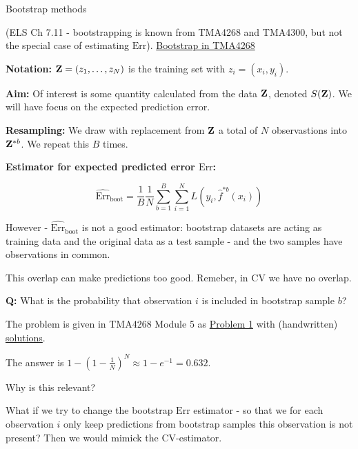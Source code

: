 \documentclass[
  ignorenonframetext,
]{beamer}
\begin{document}
\begin{frame}

\begin{block}{Bootstrap methods}

(ELS Ch 7.11 - bootstrapping is known from TMA4268 and TMA4300, but not
the special case of estimating \(\text{Err}\)).
\href{https://www.math.ntnu.no/emner/TMA4268/2019v/5Resample/5Resample.html\#the_bootstrap}{Bootstrap
in TMA4268}

\textbf{Notation:} \({\bf Z}=(z_1,\ldots,z_N)\) is the training set with
\(z_i=(x_i,y_i)\).

\textbf{Aim:} Of interest is some quantity calculated from the data
\({\bf Z}\), denoted \(S({\bf Z})\). We will have focus on the expected
prediction error.

\textbf{Resampling:} We draw with replacement from \({\bf Z}\) a total
of \(N\) observastions into \({\bf Z}^{*b}\). We repeat this \(B\)
times.

\textbf{Estimator for expected predicted error \(\text{Err}\):}

\[\widehat{\text{Err}}_{\text{boot}}=\frac{1}{B}\frac{1}{N}\sum_{b=1}^B \sum_{i=1}^N L(y_i,\hat{f}^{*b}(x_i))\]

\end{block}

\end{frame}

\begin{frame}

However - \(\widehat{\text{Err}}_{\text{boot}}\) is not a good
estimator: bootstrap datasets are acting as training data and the
original data as a test sample - and the two samples have observations
in common.

This overlap can make predictions too good. Remeber, in CV we have no
overlap.

\textbf{Q:} What is the probability that observation \(i\) is included
in bootstrap sample \(b\)?

\end{frame}

\begin{frame}

The problem is given in TMA4268 Module 5 as
\href{https://www.math.ntnu.no/emner/TMA4268/2019v/5Resample/5Resample.html\#recexboot}{Problem
1} with (handwritten)
\href{https://www.math.ntnu.no/emner/TMA4268/2019v/5Resample/5Resample-sol.pdf}{solutions}.

The answer is \(1-(1-\frac{1}{N})^N\approx 1-e^{-1}=0.632\).

Why is this relevant?

What if we try to change the bootstrap \(\text{Err}\) estimator - so
that we for each observation \(i\) only keep predictions from bootstrap
samples this observation is not present? Then we would mimick the
CV-estimator.

\end{frame}
\end{document}
